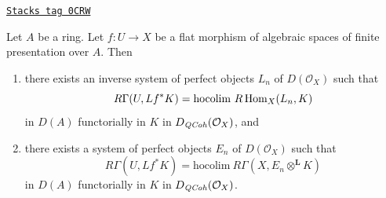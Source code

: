 \begin{lemma}
\label{spaces-perfect-lemma-computing-sections-as-colim}
\href{https://stacks.math.columbia.edu/tag/0CRW}{\texttt{Stacks tag 0CRW}}

Let $A$ be a ring. Let $f : U \to X$ be a flat morphism of algebraic spaces
of finite presentation over $A$. Then
\begin{enumerate}
\item there exists an inverse system of perfect objects $L_n$ of
$D(\mathcal{O}_X)$ such that
$$
R\Gamma(U, Lf^*K) = \text{hocolim}\ R\operatorname{Hom}_X(L_n, K)
$$
in $D(A)$ functorially in $K$ in $D_{\mathit{QCoh}}(\mathcal{O}_X)$, and
\item there exists a system of perfect objects $E_n$ of
$D(\mathcal{O}_X)$ such that
$$
R\Gamma(U, Lf^*K) = \text{hocolim}\ R\Gamma(X, E_n \otimes^\mathbf{L} K)
$$
in $D(A)$ functorially in $K$ in $D_{\mathit{QCoh}}(\mathcal{O}_X)$.
\end{enumerate}
\end{lemma}

